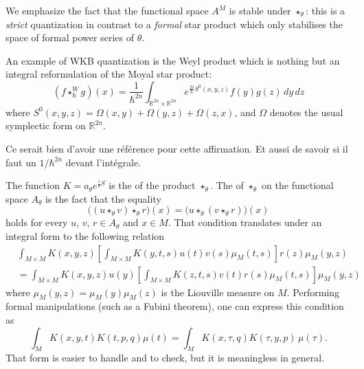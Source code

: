 We emphasize the fact that the functional space $A^M$ is stable under $\star_{\theta}$: this is a \emph{strict} quantization in contrast to a \emph{formal} star product which only stabilises the space of formal power series of $\theta$.

An example of WKB quantization is the Weyl product which is nothing but an integral reformulation of the Moyal star product:
\[ 
  (f\star^W_{\hbar}g)(x)=\frac{1}{ \hbar^{2n} }\int_{\mathbb{R}^{2n}\times\mathbb{R}^{2n}}  e^{\frac{ 2i }{ \hbar }S^0(x,y,z)}f(y)g(z)\,dy\,dz
\]
where $S^0(x,y,z)=\Omega(x,y)+\Omega(y,z)+\Omega(z,x)$, and $\Omega$ denotes the usual symplectic form on $\mathbb{R}^{2n}$.

\begin{probleme}
Ce serait bien d'avoir une référence pour cette affirmation. Et aussi de savoir si il faut un $1/\hbar^{2n}$ devant l'intégrale.
\label{ProbWeylMoy}
\end{probleme}

The function $K=a_{\theta} e^{\frac{ i }{ \theta }S}$ is the  of the product $\star_{\theta}$. The  of $\star_{\theta}$ on the functional space $A_{\theta}$ is the fact that the equality
\[ 
  \big( (u\star_{\theta}v)\star_{\theta}r \big)(x)=\big( u\star_{\theta}(v\star_{\theta}r) \big)(x)
\]
holds for every $u$, $v$, $r\in A_{\theta}$ and $x\in M$.  That condition translates under an integral form to the following relation
\begin{equation}\label{EqCondAssoc}
\begin{split}
&\int_{M\times M}K(x,y,z)\left[ \int_{M\times M}K(y,t,s)u(t)v(s)\mu_M(t,s) \right] r(z)\mu_M(y,z)\\
&=\int_{M\times M}K(x,y,z)u(y)\left[ \int_{M\times M}K(z,t,s)v(t)r(s)\mu_M(t,s) \right]\mu_M(y,z)
\end{split}
\end{equation}
where $\mu_M(y,z)=\mu_M(y)\mu_M(z)$ is the Liouville measure on $M$. Performing formal manipulations (such as a Fubini theorem), one can express this condition as
\begin{equation}		\label{EqAssosssens}
\int_{M}K(x,y,t)K(t,p,q)\mu(t)=\int_{M}K(x,\tau,q)K(\tau,y,p)\,\mu(\tau).
\end{equation}
That form is easier to handle and to check, but it is meaningless in general.

